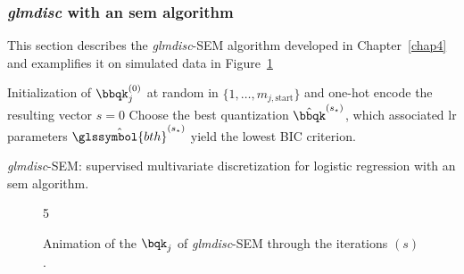 \subsubsection{\textit{glmdisc} with an \gls{sem} algorithm} \label{app1:glmdiscSEM}

This section describes the \textit{glmdisc}-SEM algorithm developed in Chapter~\ref{chap4} and examplifies it on simulated data in Figure~\ref{fig:animSEM}

\begin{algorithm}[H]
 Initialization of $\bbqk_j^{(0)}$ at random in $\{1, \dots, m_{j,\text{start}}\}$ and one-hot encode the resulting vector\;
 $s = 0$\;
 Choose the best quantization $\hat{\bbqk}^{(s_\star)}$, which associated \gls{lr} parameters $\hat{\glssymbol{bth}}^{(s_\star)}$ yield the lowest BIC criterion.
 \caption{\label{SEM-disc} \textit{glmdisc}-SEM: supervised multivariate discretization for logistic regression with an \gls{sem} algorithm.}
\end{algorithm}

\begin{figure}[!h]
\begin{animateinline}[poster=first, controls=all, palindrome, autopause, autoresume, width=\textwidth, height=10cm]{5}
%
\end{animateinline}
\caption{\label{fig:animSEM} Animation of the $\bqk_j$ of \textit{glmdisc}-SEM through the iterations $(s)$.}
\end{figure}

